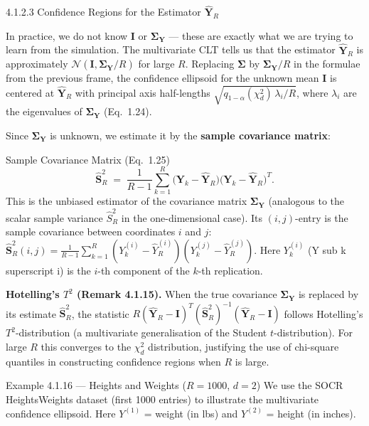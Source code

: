 \documentclass[aspectratio=169,10pt]{beamer}
\begin{document}
\begin{frame}[allowframebreaks]{4.1.2.3 Confidence Regions for the Estimator $\hat{\mathbf{Y}}_R$}

In practice, we do not know $\mathbf{I}$ or $\boldsymbol{\Sigma}_{\mathbf{Y}}$
--- these are exactly what we are trying to learn from the simulation.
The multivariate CLT tells us that the estimator $\hat{\mathbf{Y}}_R$
is approximately $\mathcal{N}(\mathbf{I}, \boldsymbol{\Sigma}_{\mathbf{Y}}/R)$
for large $R$.  Replacing $\boldsymbol{\Sigma}$ by $\boldsymbol{\Sigma}_{\mathbf{Y}}/R$
in the formulae from the previous frame, the confidence ellipsoid for
the unknown mean $\mathbf{I}$ is centered at $\hat{\mathbf{Y}}_R$ with
principal axis half-lengths $\sqrt{q_{1-\alpha}(\chi_d^2)\,\lambda_i/R}$,
where $\lambda_i$ are the eigenvalues of $\boldsymbol{\Sigma}_{\mathbf{Y}}$
(Eq.\ 1.24).

Since $\boldsymbol{\Sigma}_{\mathbf{Y}}$ is unknown, we estimate it by
the \textbf{sample covariance matrix}:

\begin{block}{Sample Covariance Matrix (Eq.\ 1.25)}
  \[
    \hat{\mathbf{S}}_R^2 \;=\; \frac{1}{R-1}\sum_{k=1}^R
      \bigl(\mathbf{Y}_k - \hat{\mathbf{Y}}_R\bigr)\bigl(\mathbf{Y}_k - \hat{\mathbf{Y}}_R\bigr)^T.
  \]
  This is the unbiased estimator of the covariance matrix
  $\boldsymbol{\Sigma}_{\mathbf{Y}}$ (analogous to the scalar sample
  variance $\hat{S}_R^2$ in the one-dimensional case).  Its $(i,j)$-entry
  is the sample covariance between coordinates $i$ and $j$:
  $\hat{\mathbf{S}}_R^2(i,j) = \frac{1}{R-1}\sum_{k=1}^R
  (Y_k^{(i)} - \hat{Y}_R^{(i)})(Y_k^{(j)} - \hat{Y}_R^{(j)})$.
  Here $Y_k^{(i)}$ (Y sub k superscript i) is the $i$-th component of
  the $k$-th replication.
\end{block}

\textbf{Hotelling's $T^2$ (Remark 4.1.15).}
When the true covariance $\boldsymbol{\Sigma}_{\mathbf{Y}}$ is replaced
by its estimate $\hat{\mathbf{S}}_R^2$, the statistic
$R(\hat{\mathbf{Y}}_R - \mathbf{I})^T(\hat{\mathbf{S}}_R^2)^{-1}(\hat{\mathbf{Y}}_R - \mathbf{I})$
follows Hotelling's $T^2$-distribution (a multivariate generalisation of
the Student $t$-distribution).  For large $R$ this converges to the
$\chi_d^2$ distribution, justifying the use of chi-square quantiles in
constructing confidence regions when $R$ is large.

\framebreak

\begin{exampleblock}{Example 4.1.16 --- Heights and Weights ($R=1000$, $d=2$)}
  We use the SOCR HeightsWeights dataset (first 1000 entries) to
  illustrate the multivariate confidence ellipsoid.  Here
  $Y^{(1)}$ = weight (in lbs) and $Y^{(2)}$ = height (in inches).


\end{exampleblock}
\end{frame}
\end{document}
